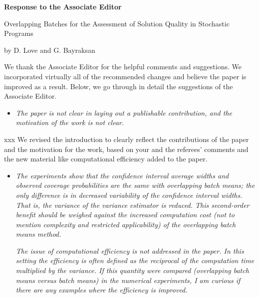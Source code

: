 \documentclass[11pt,notitlepage,onecolumn]{article}
\newcommand{\noi}{\noindent}
\begin{document}

\singlespacing

\baselineskip0.26in


\pagebreak

\begin{center}
\textbf{\Large Response to the Associate Editor} 
\medskip

{\large Overlapping Batches for the Assessment of Solution Quality in Stochastic Programs}
\medskip

{\footnotesize by D. Love and G. Bayraksan}
\end{center}

\bigskip

\bigskip 



We thank the Associate Editor for the helpful comments and suggestions. 
We incorporated virtually all of the recommended changes and believe the paper is improved as a result. 
Below, we go through in detail the suggestions of the Associate Editor.
\medskip


\begin{itemize}
\item[]\textit{The paper is not clear in laying out a publishable contribution, and the motivation of the work is not clear.}
\end{itemize}

\noi xxx 
We revised the introduction to clearly reflect the contributions of the paper and the motivation for the work, based on your and the referees' comments and the new material like computational efficiency added to the paper.
\medskip  

\begin{itemize}
\item[] \textit{%
The experiments show that the confidence interval average widths and observed coverage probabilities are the same with overlapping batch means; the only difference is in decreased variability of the confidence interval widths. 
That is, the variance of the variance estimator is reduced. 
This second-order benefit should be weighed against the increased computation cost (not to mention complexity and restricted applicability) of the overlapping batch means method.}

\textit{The issue of computational efficiency is not addressed  in the paper. 
In this setting the efficiency is often defined as the reciprocal of the computation time multiplied by the variance. 
If this quantity were compared (overlapping batch means versus batch means) in the numerical experiments, I am curious if there are any examples where the efficiency is improved.}
\end{itemize}
\end{document}
